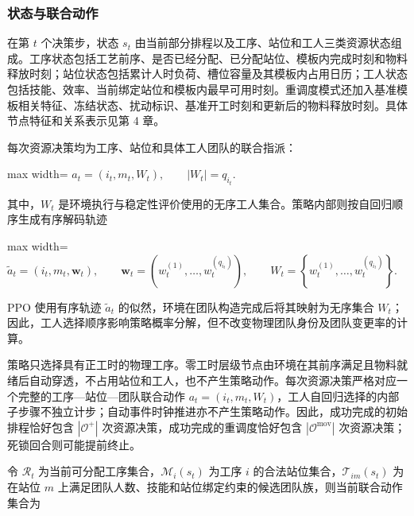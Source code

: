 \documentclass[journal,10pt]{IEEEtran}
\begin{document}
\subsubsection{状态与联合动作}\label{ux72b6ux6001ux4e0eux8054ux5408ux52a8ux4f5c}

在第 \(t\) 个决策步，状态 \(s_t\) 由当前部分排程以及工序、站位和工人三类资源状态组成。工序状态包括工艺前序、是否已经分配、已分配站位、模板内完成时刻和物料释放时刻；站位状态包括累计人时负荷、槽位容量及其模板内占用日历；工人状态包括技能、效率、当前绑定站位和模板内最早可用时刻。重调度模式还加入基准模板相关特征、冻结状态、扰动标识、基准开工时刻和更新后的物料释放时刻。具体节点特征和关系表示见第 4 章。

每次资源决策均为工序、站位和具体工人团队的联合指派：

\begin{center}
\begin{adjustbox}{max width=\columnwidth}
$\displaystyle
a_t=(i_t,m_t,W_t),
\qquad |W_t|=q_{i_t}.
$
\end{adjustbox}
\end{center}

其中，\(W_t\) 是环境执行与稳定性评价使用的无序工人集合。策略内部则按自回归顺序生成有序解码轨迹

\begin{center}
\begin{adjustbox}{max width=\columnwidth}
$\displaystyle
\widetilde a_t=\left(i_t,m_t,\mathbf w_t\right),
\qquad
\mathbf w_t=\left(w_t^{(1)},\ldots,w_t^{(q_{i_t})}\right),
\qquad
W_t=\left\{w_t^{(1)},\ldots,w_t^{(q_{i_t})}\right\}.
$
\end{adjustbox}
\end{center}

PPO 使用有序轨迹 \(\widetilde a_t\) 的似然，环境在团队构造完成后将其映射为无序集合 \(W_t\)；因此，工人选择顺序影响策略概率分解，但不改变物理团队身份及团队变更率的计算。

策略只选择具有正工时的物理工序。零工时层级节点由环境在其前序满足且物料就绪后自动穿透，不占用站位和工人，也不产生策略动作。每次资源决策严格对应一个完整的工序---站位---团队联合动作 \(a_t=(i_t,m_t,W_t)\)，工人自回归选择的内部子步骤不独立计步；自动事件时钟推进亦不产生策略动作。因此，成功完成的初始排程恰好包含 \(|\mathcal{O}^{+}|\) 次资源决策，成功完成的重调度恰好包含 \(|\mathcal{O}^{\mathrm{mov}}|\) 次资源决策；死锁回合则可能提前终止。

令 \(\mathcal{R}_t\) 为当前可分配工序集合，\(\mathcal{M}_i(s_t)\) 为工序 \(i\) 的合法站位集合，\(\mathcal{T}_{im}(s_t)\) 为在站位 \(m\) 上满足团队人数、技能和站位绑定约束的候选团队族，则当前联合动作集合为
\end{document}
